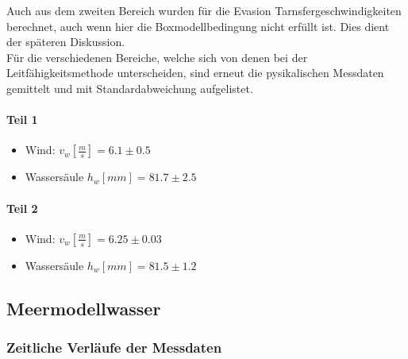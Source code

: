 \documentclass[12pt]{article}
\begin{document}
Auch aus dem zweiten Bereich wurden für die Evasion Tarnsfergeschwindigkeiten berechnet, auch wenn hier die Boxmodellbedingung nicht erfüllt ist. Dies dient
der späteren Diskussion. \\
Für die verschiedenen Bereiche, welche sich von denen bei der Leitfähigkeitsmethode unterscheiden, sind erneut die pysikalischen Messdaten gemittelt und
mit Standardabweichung aufgelistet.

\paragraph{Teil 1}
\begin{itemize}
	\item Wind: $v_w [\frac{m}{s}] = 6.1 \pm 0.5 $
	\item Wassersäule $h_w[mm] = 81.7 \pm 2.5 $
\end{itemize}
\paragraph{Teil 2}
\begin{itemize}
	\item Wind: $v_w [\frac{m}{s}] = 6.25 \pm 0.03 $
	\item Wassersäule $h_w[mm] = 81.5 \pm 1.2 $
\end{itemize}

\subsection{Meermodellwasser}
\subsubsection{Zeitliche Verl\"aufe der Messdaten}
\end{document}
